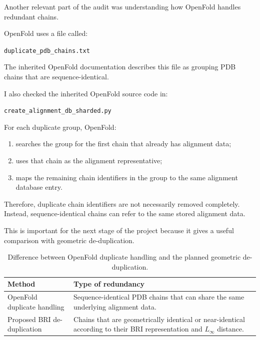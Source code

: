 \documentclass[11pt,a4paper]{article}
\begin{document}
Another relevant part of the audit was understanding how OpenFold handles redundant chains.

OpenFold uses a file called:

\begin{center}
\texttt{duplicate\_pdb\_chains.txt}
\end{center}

The inherited OpenFold documentation describes this file as grouping PDB chains that are sequence-identical.

I also checked the inherited OpenFold source code in:

\begin{center}
\texttt{create\_alignment\_db\_sharded.py}
\end{center}

For each duplicate group, OpenFold:

\begin{enumerate}[leftmargin=*]

    \item searches the group for the first chain that already has alignment data;

    \item uses that chain as the alignment representative;

    \item maps the remaining chain identifiers in the group to the same alignment database entry.

\end{enumerate}

Therefore, duplicate chain identifiers are not necessarily removed completely. Instead, sequence-identical chains can refer to the same stored alignment data.

This is important for the next stage of the project because it gives a useful comparison with geometric de-duplication.

\begin{table}[h]
\centering
\begin{tabular}{
>{\raggedright\arraybackslash}p{}
>{\raggedright\arraybackslash}p{}}
\toprule
\textbf{Method} & \textbf{Type of redundancy} \\
\midrule

OpenFold duplicate handling &
Sequence-identical PDB chains that can share the same underlying alignment data. \\

Proposed BRI de-duplication &
Chains that are geometrically identical or near-identical according to their BRI representation and $L_{\infty}$ distance. \\

\bottomrule
\end{tabular}
\caption{Difference between OpenFold duplicate handling and the planned geometric de-duplication.}
\end{table}
\end{document}
